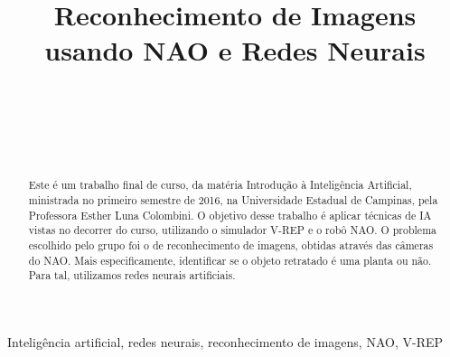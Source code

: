 \documentclass[twoside,conference,a4paper]{IEEEtran}
\begin{document}
\renewcommand{\IEEEkeywordsname}{Palavras-chave}

\title{Reconhecimento de Imagens usando NAO e Redes Neurais}
\author{
 \\

 \\

 \\

 \\
}


\maketitle

\begin{abstract}
 Este é um trabalho final de curso, da matéria Introdução à Inteligência Artificial, ministrada no primeiro semestre de 2016, na Universidade Estadual de Campinas, pela Professora Esther Luna Colombini. O objetivo desse trabalho é aplicar técnicas de IA vistas no decorrer do curso, utilizando o simulador V-REP e o robô NAO. O problema escolhido pelo grupo foi o de reconhecimento de imagens, obtidas através das câmeras do NAO. Mais especificamente, identificar se o objeto retratado é uma planta ou não. Para tal, utilizamos redes neurais artificiais.
\end{abstract}

\begin{IEEEkeywords}
 Inteligência artificial, redes neurais, reconhecimento de imagens, NAO, V-REP
\end{IEEEkeywords}
\end{document}
